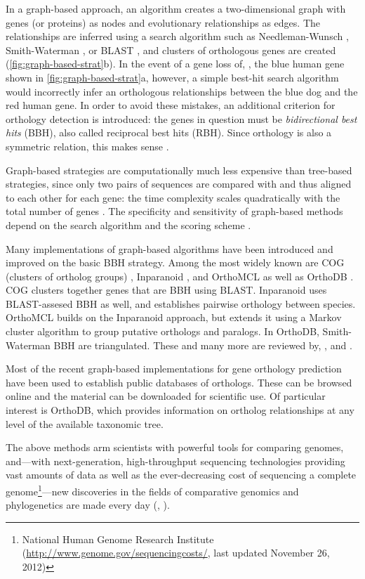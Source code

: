 In a graph-based approach, an algorithm creates a two-dimensional graph with
genes (or proteins) as nodes and evolutionary relationships as edges. The
relationships are inferred using a search algorithm such as Needleman-Wunsch
\citeyearpar{needleman1970}, Smith-Waterman \citeyearpar{smith1981}, or BLAST
\citep{altschul1990}, and clusters of orthologous genes are created
(\autoref{fig:graph-based-strat}b). In the event of a gene loss of, \eg, the
blue human gene shown in \autoref{fig:graph-based-strat}a, however, a simple
best-hit search algorithm would incorrectly infer an orthologous relationships
between the blue dog and the red human gene. In order to avoid these mistakes,
an additional criterion for orthology detection is introduced: the genes in
question must be \emph{bidirectional best hits} (BBH), also called reciprocal
best hits (RBH). Since orthology is also a symmetric relation, this makes sense
.



Graph-based strategies are computationally much less expensive than tree-based
strategies, since only two pairs of sequences are compared with and thus aligned
to each other for each gene: the time complexity scales quadratically with the
total number of genes \citep{altenhoff2012-1}. The specificity and sensitivity
of graph-based methods depend on the search algorithm and the scoring scheme
\citep{hulsen2006}.

Many implementations of graph-based algorithms have been introduced and improved
on the basic BBH strategy. Among the most widely known are COG (clusters of
ortholog groups) \citep{tatusov2003}, Inparanoid \citep{ostlund2010}, and
OrthoMCL \citep{li2003} as well as OrthoDB \citep{waterhouse2011}. COG clusters
together genes that are BBH using BLAST. Inparanoid uses BLAST-assesed BBH as
well, and establishes pairwise orthology between species. OrthoMCL builds on the
Inparanoid approach, but extends it using a Markov cluster algorithm to group
putative orthologs and paralogs. In OrthoDB, Smith-Waterman BBH are
triangulated. These and many more are reviewed by, \eg, \citet{kuzniar2008} and
\citet{forslund2011}.

Most of the recent graph-based implementations for gene orthology prediction
have been used to establish public databases of orthologs. These can be browsed
online and the material can be downloaded for scientific use. Of particular
interest is OrthoDB, which provides information on ortholog relationships at any
level of the available taxonomic tree. 

The above methods arm scientists with powerful tools for comparing genomes,
and---with next-generation, high-throughput sequencing technologies providing
vast amounts of data as well as the ever-decreasing cost of sequencing a
complete genome\footnote{National Human Genome Research Institute
(\url{http://www.genome.gov/sequencingcosts/}, last updated November 26,
2012)}---new discoveries in the fields of comparative genomics and phylogenetics
are made every day (\eg, \citet{niehuis2012, bradbury2012}).


